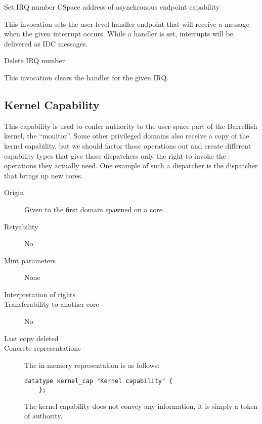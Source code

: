 \begin{invocation}{Set}
  \arg IRQ number
  \arg CSpace address of asynchronous endpoint capability
\end{invocation}
This invocation sets the user-level handler endpoint that will receive
a message when the given interrupt occurs.  While a handler is set,
interrupts will be delivered as IDC messages.


\begin{invocation}{Delete}
  \arg IRQ number
\end{invocation}
This invocation clears the handler for the given IRQ.

\subsection{Kernel Capability}
This capability is used to confer authority to the user-space part of the
Barrelfish kernel, the ``monitor''.
Some other privileged domains also receive a copy of the kernel capability,
but we should factor those operations out and create different capability
types that give those dispatchers only the right to invoke the operations they
actually need.
One example of such a dispatcher is the dispatcher that brings up new cores.

\begin{description}
\item[Origin] Given to the first domain spawned on a core.
  
\item[Retyability] No
  
\item[Mint parameters] None
  
\item[Interpretation of rights] 
  
\item[Transferability to another core] No

\item[Last copy deleted] 
  
\item[Concrete representations] The in-memory representation is as follows:
  
  \begin{lstlisting}[language=Mackerel]
    datatype kernel_cap "Kernel capability" {
    };
  \end{lstlisting}

    The kernel capability does not convey any information, it is simply a
    token of authority.
\end{description}

